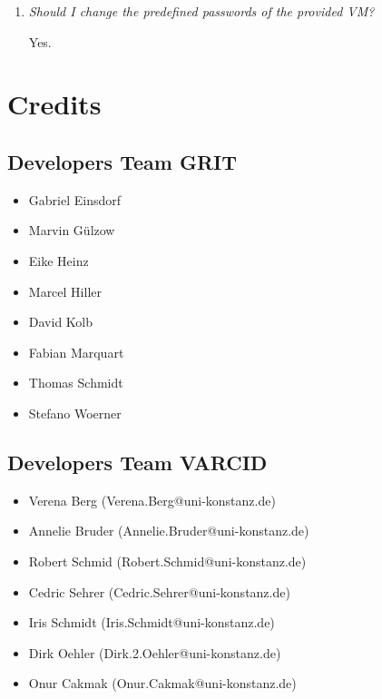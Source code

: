 \documentclass[10pt,a4paper, titlepage, toc=idx]{scrreprt}
\theoremstyle{definition}
\theoremstyle{plain}
\newcommand*{\product}{Grit}
\begin{document}
\begin{enumerate}
		
		
        \item \textit{Should I change the predefined passwords of the
            provided VM?}
		
          Yes.
		
%		
		
	\end{enumerate}
	\chapter{Credits}
	\section{Developers Team GRIT}
	\begin{itemize}[label=]
        \item Gabriel Einsdorf
        \item Marvin Gülzow
        \item Eike Heinz
        \item Marcel Hiller
        \item David Kolb
        \item Fabian Marquart
        \item Thomas Schmidt
        \item Stefano Woerner
	\end{itemize}
	\section{Developers Team VARCID}
	\begin{itemize}[label=]
        \item Verena Berg \hfill (Verena.Berg@uni-konstanz.de)
        \item Annelie Bruder \hfill (Annelie.Bruder@uni-konstanz.de)
        \item Robert Schmid \hfill (Robert.Schmid@uni-konstanz.de)
        \item Cedric Sehrer \hfill (Cedric.Sehrer@uni-konstanz.de)
        \item Iris Schmidt \hfill (Iris.Schmidt@uni-konstanz.de)
        \item Dirk Oehler \hfill (Dirk.2.Oehler@uni-konstanz.de)
        \item Onur Cakmak \hfill (Onur.Cakmak@uni-konstanz.de)
	\end{itemize}
\end{document}
